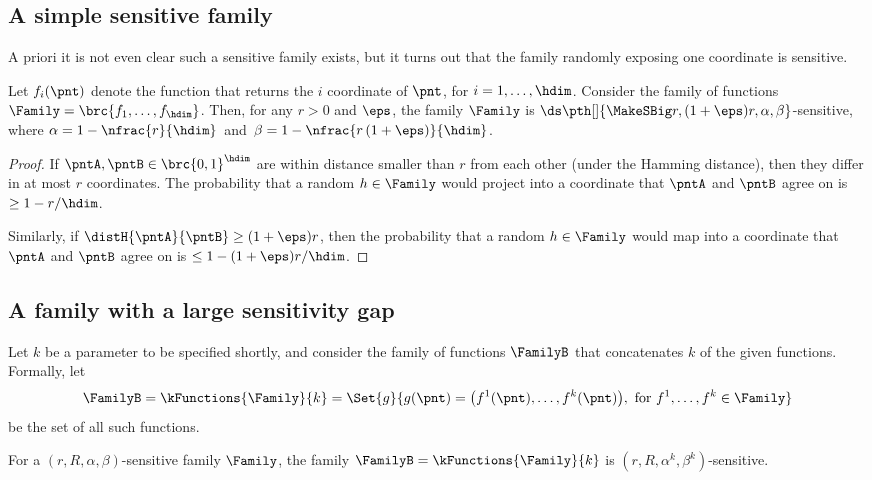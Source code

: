 \subsection{A simple sensitive family} %
%
A priori it is not even clear such a sensitive family exists, but it
turns out that the family randomly exposing one coordinate is
sensitive.

\begin{lemma}
    Let $f_i(\pnt)$ denote the function that returns the $i$\th
    coordinate of $\pnt$, for $i=1,\ldots, \hdim$.  Consider the
    family of functions $\Family = \brc{f_1, \ldots, f_\hdim}$.  Then,
    for any $r>0$ and $\eps$, the family $\Family$ is $\ds \pth[]{
       \MakeSBig r, (1+\eps)r, \alpha, \beta }$-sensitive, where
    $\alpha = 1-\nfrac{r}{\hdim}\,$ and $\,\beta = 1 -
    \nfrac{r \,(1+\eps)}{\hdim}$.    
\end{lemma}

\begin{proof}
    If $\pntA,\pntB \in \brc{0,1}^\hdim$ are within distance smaller
    than $r$ from each other (under the Hamming distance), then they
    differ in at most $r$ coordinates. The probability that a random
    $h \in \Family$ would project into a coordinate that $\pntA$ and
    $\pntB$ agree on is $\geq 1-r/\hdim$.

    Similarly, if $\distH{\pntA}{\pntB} \geq (1+\eps)r$, then the
    probability that a random $h\in \Family$ would map into a
    coordinate that $\pntA$ and $\pntB$ agree on is $\leq 1 -
    (1+\eps)r/\hdim$.
\end{proof}

\subsection{A family with a large sensitivity gap}

Let $k$ be a parameter to be specified shortly, and consider the
family of functions $\FamilyB$ that concatenates $k$ of the given
functions. Formally, let
\begin{align*}
  \FamilyB%
  =%
  \kFunctions{\Family}{k}%
  =%
  \Set{ g }{ g(\pnt) = \bigl(f^1(\pnt),
  \ldots, f^k(\pnt)\bigr), \text{ for } f^1, \ldots, f^k \in
  \Family}
\end{align*}
be the set of all such functions.

\begin{lemma}
    For a $(r, R, \alpha, \beta)$-sensitive family $\Family$, the
    family $\FamilyB = \kFunctions{\Family}{k}$ is
    $(r, R, \alpha^k, \beta^k)$-sensitive.
\end{lemma}

